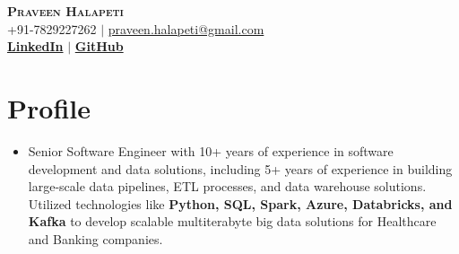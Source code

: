 \documentclass[letterpaper,11pt]{article}
\begin{document}




\begin{center}
    \textbf{\Huge \scshape Praveen Halapeti} \\ \vspace{1pt}
    \small +91-7829227262 $|$ \href{mailto:mverma6250@gmail.com}{{praveen.halapeti@gmail.com}}    \\ 
    \small  
    \href{https://linkedin.com/in/praveenhalapeti/}{\bf LinkedIn} $|$
    \href{https://github.com/praveenhalapeti}{\bf GitHub} 
    
\end{center}



\section{Profile}
\begin{itemize}[leftmargin=0.15in, label={}]
\item 
Senior Software Engineer with 10+ years of experience in software development and data solutions, including 5+ years of experience in
building large-scale data pipelines, ETL processes, and data warehouse solutions. Utilized technologies like \textbf{Python, SQL, Spark, Azure, Databricks, and Kafka} to develop scalable multiterabyte big data solutions for Healthcare and Banking companies.
\end{itemize}
\end{document}
